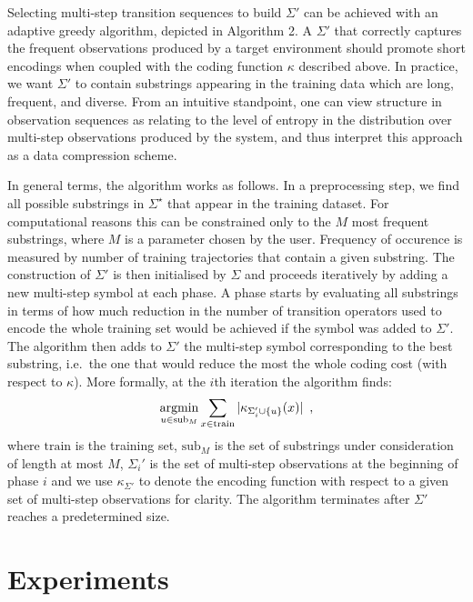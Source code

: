 \documentclass[letterpaper]{article}
\newcommand{\sstar}{\Sigma^\star}
\DeclareMathOperator*{\argmin}{\rm argmin}
\begin{document}
Selecting multi-step transition sequences to build $\Sigma'$ can be achieved with an adaptive greedy algorithm, depicted in Algorithm 2. A $\Sigma'$ that correctly captures the frequent observations produced by a target environment should promote short encodings when coupled with the coding function $\kappa$ described above. In practice, we want $\Sigma'$ to contain substrings appearing in the training data which are long, frequent, and diverse. From an intuitive standpoint, one can view structure in observation sequences as relating to the level of entropy in the distribution over multi-step observations produced by the system, and thus interpret this approach as a data compression scheme. 

In general terms, the algorithm works as follows. In a preprocessing step, we find all possible substrings in $\sstar$ that appear in the training dataset. For computational reasons this can be constrained only to the $M$ most frequent substrings, where $M$ is a parameter chosen by the user. Frequency of occurence is measured by number of training trajectories that contain a given substring. The construction of $\Sigma'$ is then initialised by $\Sigma$ and proceeds iteratively by adding a new multi-step symbol at each phase. A phase starts by evaluating all substrings in terms of how much reduction in the number of transition operators used to encode the whole training set would be achieved if the symbol was added to $\Sigma'$. The algorithm then adds to $\Sigma'$ the multi-step symbol corresponding to the best substring, i.e.\ the one that would reduce the most the whole coding cost (with respect to $\kappa$). More formally, at the $i$th iteration the algorithm finds:
\begin{equation*}
\argmin_{u \in \mathrm{sub}_M} \sum_{x \in \mathrm{train}} |\kappa_{\Sigma_i' \cup \{u\}}(x)| \enspace,
\end{equation*}
where $\mathrm{train}$ is the training set, $\mathrm{sub}_M$ is the set of substrings under consideration of length at most $M$, $\Sigma_i'$ is the set of multi-step observations at the beginning of phase $i$ and we use $\kappa_{\Sigma'}$ to denote the encoding function with respect to a given set of multi-step observations for clarity. The algorithm terminates after $\Sigma'$ reaches a predetermined size.




\section{Experiments}\label{sec:exp}
\end{document}
